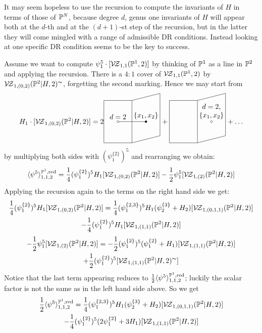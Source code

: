 It may seem hopeless to use the recursion to compute the invariants of $H$ in terms of those of $\mathbb P^N$, because degree $d$, genus one invariants of $H$ will appear both at the $d$-th and at the $(d+1)$-st step of the recursion, but in the latter they will come mingled with a range of admissible DR conditions. Instead looking at one specific DR condition seems to be the key to success.
\begin{ex}
 Assume we want to compute $\psi_1^5\cdot[\mathcal{V\!Z}_{1,1}(\mathbb P^1,2)]$ by thinking of $\mathbb P^1$ as a line in $\mathbb P^2$ and applying the recursion. There is a $4:1$ cover of $\mathcal{V\!Z}_{1,1}(\mathbb P^1,2)$ by $\mathcal{V\!Z}_{1,(0,2)}(\mathbb P^2|H,2)^\thicksim$, forgetting the second marking. Hence we may start from
 \[
 H_1\cdot[\VZ{(0,2)}{\PP^2|H}{2}]=
 2{\tikz[baseline=-3pt,scale=.7]{
\draw (2,0) node[above]{$\{x_1,x_2\}$} -- (0,0)node[above]{$d=2$};
\draw (2,0) circle(2pt)[fill=black];
\draw (0,0) circle(2pt)[fill=white];
\draw (-1,1.5) -- (1,1.5) -- (1,-1.5) -- (-1,-1.5) -- (-1,1.5);
\draw (1,1.5) -- (3,2) -- (3,-1) -- (1,-1.5);
}}+
{\tikz[baseline=-3pt,scale=.7]{
\draw (2,0) node[above,align=center]{$d=2$,\\$\{x_1,x_2\}$};
\draw (2,0) circle(2pt)[fill=white];
\draw (-1,1.5) -- (1,1.5) -- (1,-1.5) -- (-1,-1.5) -- (-1,1.5);
\draw (1,1.5) -- (3,2) -- (3,-1) -- (1,-1.5);
}}+\ldots
 \]
by multiplying both sides with $(\psi_1^{\{2\}})^5$ and rearranging we obtain:
\[\langle \psi^5\rangle^{\mathbb P^1,\rm{red}}_{1,1,2}=\frac{1}{4}(\psi_1^{\{2\}})^5H_1[\mathcal{V\!Z}_{1,(0,2)}(\mathbb P^2|H,2)]-\frac{1}{2}\psi_1^5[\mathcal{V\!Z}_{1,(2)}(\mathbb P^2|H,2)]\]
 Applying the recursion again to the terms on the right hand side we get:
 \begin{multline*}\frac{1}{4}(\psi_1^{\{2\}})^5H_1[\mathcal{V\!Z}_{1,(0,2)}(\mathbb P^2|H,2)]=\frac{1}{4}(\psi_1^{\{2,3\}})^5H_1(\psi_2^{\{3\}}+H_2)[\mathcal{V\!Z}_{1,(0,1,1)}(\mathbb P^2|H,2)]\\ -\frac{1}{4}(\psi_1^{\{2\}})^5H_1[\mathcal{V\!Z}_{1,(1,1)}(\mathbb P^2|H,2)]\end{multline*}
 \begin{multline*}-\frac{1}{2}\psi_1^5[\mathcal{V\!Z}_{1,(2)}(\mathbb P^2|H,2)]=-\frac{1}{2}(\psi_1^{\{2\}})^5(\psi_1^{\{2\}}+H_1)[\mathcal{V\!Z}_{1,(1,1)}(\mathbb P^2|H,2)]\\+\frac{1}{2}(\psi_1^{\{2\}})^5[\mathcal{V\!Z}_{1,(1,1)}(\mathbb P^2|H,2)^\thicksim]\end{multline*}
 Notice that the last term appearing reduces to $\frac{1}{2}\langle \psi^5\rangle^{\mathbb P^1,\rm{red}}_{1,1,2}$; luckily the scalar factor is not the same as in the left hand side above. So we get
 \begin{multline*}
  \frac{1}{2}\langle \psi^5\rangle^{\PP^1,\rm{red}}_{1,1,2}=\frac{1}{4}(\psi_1^{\{2,3\}})^5H_1(\psi_2^{\{3\}}+H_2)[\VZ{(0,1,1)}{\PP^2|H}{2}] \\ -\frac{1}{4}(\psi_1^{\{2\}})^5(2\psi_1^{\{2\}}+3H_1)[\VZ{(1,1)}{\PP^2|H}{2}]

\end{multline*}
\end{ex}
